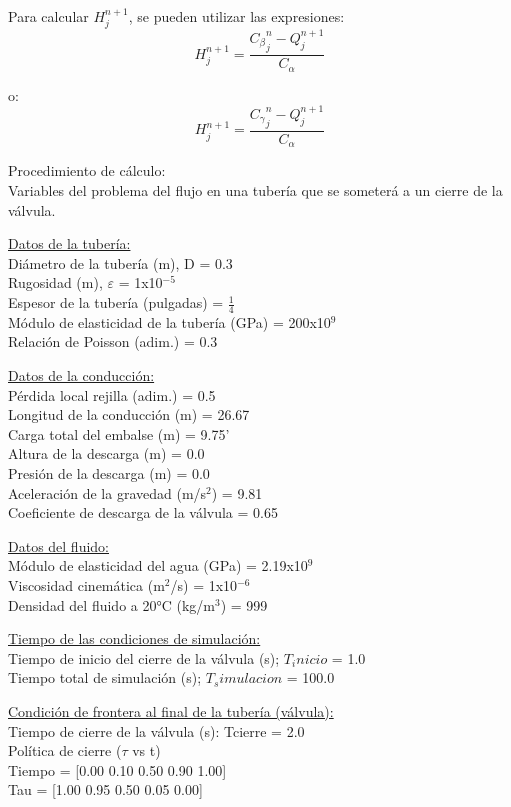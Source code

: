 \documentclass[letterpaper]{report}
\begin{document}
Para calcular $H_j^{n+1}$, se pueden utilizar las expresiones:
\begin{equation}
	H_j^{n+1}=\dfrac{{C_\beta}_j^n-Q_j^{n+1}}{C_\alpha}
\end{equation}

o:
\begin{equation}
	H_j^{n+1}=\dfrac{{C_\gamma}_j^n-Q_j^{n+1}}{C_\alpha}
\end{equation}

Procedimiento de cálculo:\\
Variables del problema del flujo en una tubería que se someterá a un cierre de la válvula.
\begin{mdframed}[backgroundcolor=azulpastel]
	\underline{Datos de la tubería:}\\
	Diámetro de la tubería (m), D = 0.3\\ 
	Rugosidad (m), $\varepsilon$ = 1x10$^{-5}$ \\
	Espesor de la tubería (pulgadas) = $\frac{1}{4}$\\ 
	Módulo de elasticidad de la tubería (GPa) = 200x10$^9$\\ 
	Relación de Poisson (adim.) = 0.3 \bigskip
	
	\underline{Datos de la conducción:}\\
	Pérdida local rejilla (adim.) = 0.5 \\
	Longitud de la conducción (m) = 26.67\\   
	Carga total del embalse (m) = 9.75'\\
	Altura de la descarga (m) = 0.0  \\
	Presión de la descarga (m) = 0.0  \\
	Aceleración de la gravedad (m/s$^2$) = 9.81 \\ 
	Coeficiente de descarga de la válvula = 0.65 \bigskip 
	
	\underline{Datos del fluido:}\\
	Módulo de elasticidad del agua (GPa) = 2.19x10$^9$  \\
	Viscosidad cinemática (m$^2$/s) = 1x10$^{-6}$ \\
	Densidad del fluido a 20°C (kg/m$^3$) = 999 \bigskip
	
	\underline{Tiempo de las condiciones de simulación:}\\
	Tiempo de inicio del cierre de la válvula (s); $T_inicio$ = 1.0\\  
	Tiempo total de simulación (s); $T_simulacion$ = 100.0 \bigskip
	
	\underline{Condición de frontera al final de la tubería (válvula):}\\
	Tiempo de cierre de la válvula (s): Tcierre = 2.0\\
	Política de cierre ($\tau$ vs t)\\
	Tiempo = [0.00 0.10 0.50 0.90 1.00]\\
	Tau = [1.00 0.95 0.50 0.05 0.00]\\
\end{mdframed}
\end{document}
